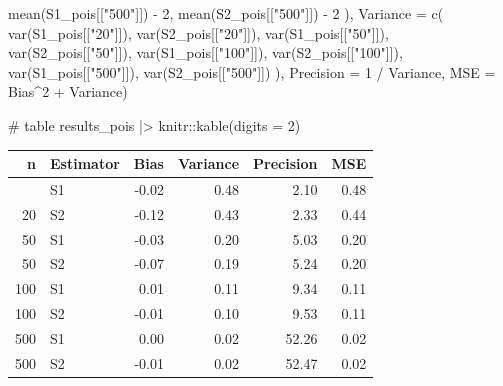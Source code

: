 \documentclass[
]{article}
\newenvironment{Shaded}{\begin{snugshade}}{\end{snugshade}}
\newcommand{\AttributeTok}[1]{\textcolor[rgb]{0.40,0.45,0.13}{#1}}
\newcommand{\CommentTok}[1]{\textcolor[rgb]{0.37,0.37,0.37}{#1}}
\newcommand{\DecValTok}[1]{\textcolor[rgb]{0.68,0.00,0.00}{#1}}
\newcommand{\FunctionTok}[1]{\textcolor[rgb]{0.28,0.35,0.67}{#1}}
\newcommand{\NormalTok}[1]{\textcolor[rgb]{0.00,0.23,0.31}{#1}}
\newcommand{\SpecialCharTok}[1]{\textcolor[rgb]{0.37,0.37,0.37}{#1}}
\newcommand{\StringTok}[1]{\textcolor[rgb]{0.13,0.47,0.30}{#1}}
\begin{document}
\begin{Shaded}
\begin{Highlighting}[numbers=left,,]
    \FunctionTok{mean}\NormalTok{(S1\_pois[[}\StringTok{"500"}\NormalTok{]]) }\SpecialCharTok{{-}} \DecValTok{2}\NormalTok{, }\FunctionTok{mean}\NormalTok{(S2\_pois[[}\StringTok{"500"}\NormalTok{]]) }\SpecialCharTok{{-}} \DecValTok{2}
\NormalTok{  ),}
  \AttributeTok{Variance =} \FunctionTok{c}\NormalTok{(}
    \FunctionTok{var}\NormalTok{(S1\_pois[[}\StringTok{"20"}\NormalTok{]]),  }\FunctionTok{var}\NormalTok{(S2\_pois[[}\StringTok{"20"}\NormalTok{]]),}
    \FunctionTok{var}\NormalTok{(S1\_pois[[}\StringTok{"50"}\NormalTok{]]),  }\FunctionTok{var}\NormalTok{(S2\_pois[[}\StringTok{"50"}\NormalTok{]]),}
    \FunctionTok{var}\NormalTok{(S1\_pois[[}\StringTok{"100"}\NormalTok{]]), }\FunctionTok{var}\NormalTok{(S2\_pois[[}\StringTok{"100"}\NormalTok{]]),}
    \FunctionTok{var}\NormalTok{(S1\_pois[[}\StringTok{"500"}\NormalTok{]]), }\FunctionTok{var}\NormalTok{(S2\_pois[[}\StringTok{"500"}\NormalTok{]])}
\NormalTok{  ),}
  \AttributeTok{Precision =} \DecValTok{1} \SpecialCharTok{/}\NormalTok{ Variance,}
  \AttributeTok{MSE =}\NormalTok{ Bias}\SpecialCharTok{\^{}}\DecValTok{2} \SpecialCharTok{+}\NormalTok{ Variance)}

\CommentTok{\# table}
\NormalTok{results\_pois }\SpecialCharTok{|\textgreater{}}\NormalTok{ knitr}\SpecialCharTok{::}\FunctionTok{kable}\NormalTok{(}\AttributeTok{digits =} \DecValTok{2}\NormalTok{)}
\end{Highlighting}
\end{Shaded}

\begin{longtable}[]{@{}rlrrrr@{}}
\toprule\noalign{}
n & Estimator & Bias & Variance & Precision & MSE \\
\midrule\noalign{}
\endhead
\bottomrule\noalign{}
\endlastfoot
20 & S1 & -0.02 & 0.48 & 2.10 & 0.48 \\
20 & S2 & -0.12 & 0.43 & 2.33 & 0.44 \\
50 & S1 & -0.03 & 0.20 & 5.03 & 0.20 \\
50 & S2 & -0.07 & 0.19 & 5.24 & 0.20 \\
100 & S1 & 0.01 & 0.11 & 9.34 & 0.11 \\
100 & S2 & -0.01 & 0.10 & 9.53 & 0.11 \\
500 & S1 & 0.00 & 0.02 & 52.26 & 0.02 \\
500 & S2 & -0.01 & 0.02 & 52.47 & 0.02 \\
\end{longtable}
\end{document}
